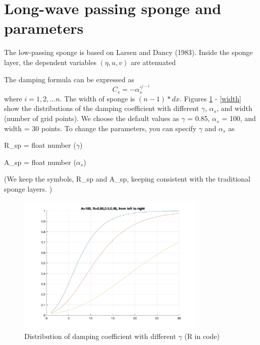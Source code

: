 \documentclass[preprint,10pt]{elsarticle}
\newcommand{\be}{\begin{equation}}
\newcommand{\ee}{\end{equation}}
\begin{document}
\section{Long-wave passing sponge and parameters}

The low-passing sponge is based on Larsen and Dancy (1983). Inside the sponge layer, the dependent variables $(\eta, u, v)$ are attenuated 

The damping formula can be expressed as
\be
C_s = -\alpha_s^{\gamma^{i-1}}
\ee
where $i = 1, 2, ... n$. The width of sponge is $(n-1)*dx$.  Figures \ref{R} - \ref{width} show the distributions of the damping coefficient with different $\gamma$,  $\alpha_s$, and width (number of grid points). We choose the default values as   $\gamma$ = 0.85, $\alpha_s$ = 100, and width = 30 points. To change the parameters, you can specify $\gamma$ and  $\alpha_s$ as

R\_sp = float number ($\gamma$)

A\_sp = float number ($\alpha_s$)

(We keep the symbols, R\_sp and A\_sp, keeping consistent with the traditional sponge layers. )

 \begin{figure}
\begin{center}
 \includegraphics[width=0.8\textwidth]{figures/test_sponge_R.jpg}
 \caption{Distribution of damping coefficient with different $\gamma$ (R in code) }
 \label{R}
 \end{center}
 \end{figure}  
\end{document}

